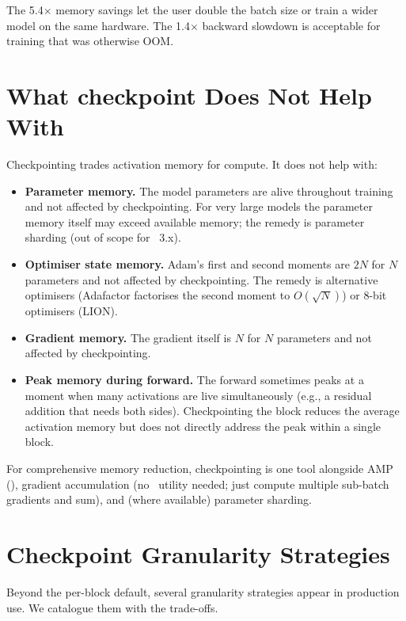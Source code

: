 The 5.4$\times$ memory savings let the user double the batch
size or train a wider model on the same hardware. The 1.4$\times$
backward slowdown is acceptable for training that was otherwise
OOM.

\section{What checkpoint Does Not Help With}
\label{sec:gradient_checkpointing:not_help}

Checkpointing trades activation memory for compute. It does not
help with:

\begin{itemize}
  \item \textbf{Parameter memory.} The model parameters are alive
    throughout training and not affected by checkpointing. For
    very large models the parameter memory itself may exceed
    available memory; the remedy is parameter sharding (out of
    scope for \Lucid\ 3.x).
  \item \textbf{Optimiser state memory.} Adam's first and second
    moments are $2N$ for $N$ parameters and not affected by
    checkpointing. The remedy is alternative optimisers (Adafactor
    factorises the second moment to $O(\sqrt{N})$) or 8-bit
    optimisers (LION).
  \item \textbf{Gradient memory.} The gradient itself is $N$ for
    $N$ parameters and not affected by checkpointing.
  \item \textbf{Peak memory during forward.} The forward
    sometimes peaks at a moment when many activations are live
    simultaneously (e.g., a residual addition that needs both
    sides). Checkpointing the block reduces the average activation
    memory but does not directly address the peak within a single
    block.
\end{itemize}

For comprehensive memory reduction, checkpointing is one tool
alongside AMP (), gradient accumulation (no
\Lucid\ utility needed; just compute multiple sub-batch
gradients and sum), and (where available) parameter sharding.

\section{Checkpoint Granularity Strategies}
\label{sec:gradient_checkpointing:granularity_strategies}

Beyond the per-block default, several granularity strategies
appear in production use. We catalogue them with the trade-offs.

